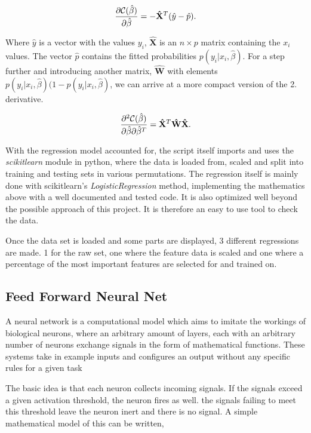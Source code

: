 \documentclass[10pt]{article}
\begin{document}
\begin{align}
	\pdv{\mathcal{C}(\hat{\beta})}{\hat{\beta}} = 
		- \mathbf{\hat{X}}^T (\hat{y} - \hat{p}).
	\label{Cost1stDerivative}
\end{align}

Where $\hat{y}$ is a vector with the values $y_i$, $\mathbf{\hat{X}}$ is an
$n\times p$ matrix containing the $x_i$ values. The vector $\hat{p}$ contains
the fitted probabilities $p(y_i|x_i,\hat{\beta})$. For a step further and
introducing another matrix, $\mathbf{\hat{W}}$ with elements
$p(y_i|x_i,\hat{\beta})(1 - p(y_i|x_i,\hat{\beta})$, we can arrive at a more
compact version of the 2. derivative. 

\begin{align}
	\pdv[2]{\mathcal{C}(\hat{\beta})}{\hat{\beta}}{\hat{\beta}^T} 
		= \mathbf{\hat{X}}^T \mathbf{\hat{W}} \mathbf{\hat{X}}
	\label{Cost2ndDerivative}.
\end{align}

With the regression model accounted for, the script itself imports and uses the
\emph{scikitlearn} module in python, where the data is loaded from, scaled and
split into training and testing sets in various permutations. The regression itself is
mainly done with scikitlearn's \emph{LogisticRegression} method, implementing
the mathematics above with a well documented and tested code. It is also
optimized well beyond the possible approach of this project. It is therefore an
easy to use tool to check the data. 

Once the data set is loaded and some parts are displayed, 3 different
regressions are made. 1 for the raw set, one where the feature data is scaled
and one where a percentage of the most important features are selected for and
trained on.

\subsection{Feed Forward Neural Net}

A neural network is a computational model which aims to imitate the workings of
biological neurons, where an arbitrary amount of layers, each with an arbitrary
number of neurons exchange signals in the form of mathematical functions. These
systems take in example inputs and configures an output without any specific
rules for a given task

The basic idea is that each neuron collects incoming signals. If the signals exceed
a given activation threshold, the neuron fires as well. the signals failing to meet this
threshold leave the neuron inert and there is no signal. A simple mathematical model of this
can be written,
\end{document}
